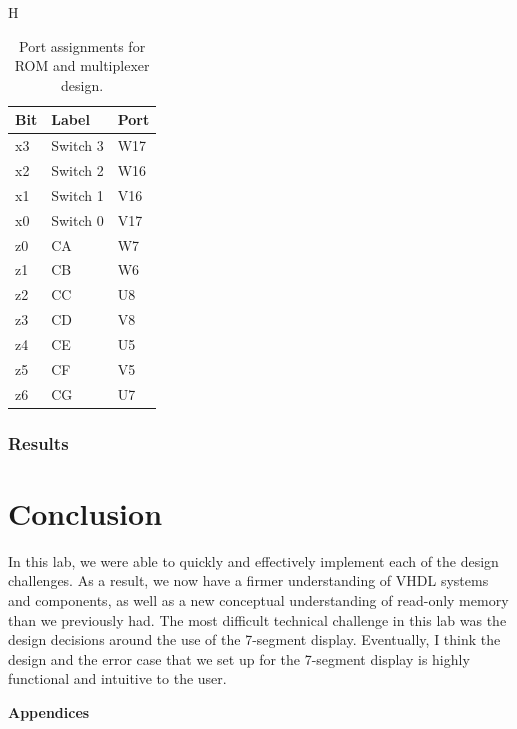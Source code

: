 \documentclass[11pt]{article}
\begin{document}
\begin{table}{H}
\begin{center}
\begin{tabular}{| l | l | l |}
	\hline
	Bit & Label & Port \\ \hline
	x3 & Switch 3 & W17 \\ \hline
	x2 & Switch 2 & W16 \\ \hline
	x1 & Switch 1 & V16 \\ \hline
	x0 & Switch 0 & V17 \\ \hline
	z0 & CA & W7 \\ \hline
	z1 & CB & W6 \\ \hline
	z2 & CC & U8 \\ \hline
	z3 & CD & V8 \\ \hline
	z4 & CE & U5 \\ \hline
	z5 & CF & V5 \\ \hline
	z6 & CG & U7 \\ \hline
\end{tabular}
\caption{\label{tab:romMuxPorts}Port assignments for ROM and multiplexer design.}
\end{center}
\end{table}

\subsubsection{Results}

\section{Conclusion}
In this lab, we were able to quickly and effectively implement each of the design challenges. As a result, we now have a firmer understanding of VHDL systems and components, as well as a new conceptual understanding of read-only memory than we previously had. The most difficult technical challenge in this lab was the design decisions around the use of the 7-segment display. Eventually, I think the design and the error case that we set up for the 7-segment display is highly functional and intuitive to the user.

\pagebreak

\textbf{Appendices}
\end{document}
